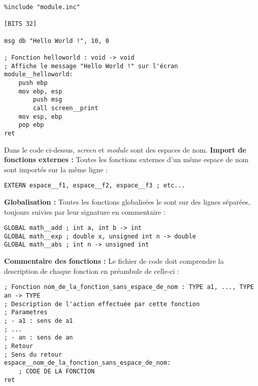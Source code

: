 \documentclass{book}
\begin{document}
\begin{lstlisting}[title=module.asm]
\end{lstlisting}
\begin{verbatim}
%include "module.inc"

[BITS 32]

msg db "Hello World !", 10, 0

; Fonction helloworld : void -> void
; Affiche le message "Hello World !" sur l'écran
module__helloworld:
	push ebp
	mov ebp, esp
		push msg
		call screen__print
	mov esp, ebp
	pop ebp
ret
\end{verbatim}
Dans le code ci-dessus, \textit{screen} et \textit{module} sont des espaces de nom.
\textbf{Import de fonctions externes :} Toutes les fonctions externes d'un même espace de nom sont importés sur la même ligne :
\begin{verbatim}
EXTERN espace__f1, espace__f2, espace__f3 ; etc...
\end{verbatim}
\textbf{Globalisation :} Toutes les fonctions globalisées le sont sur des lignes séparées, toujours suivies par leur signature en commentaire :
\begin{verbatim}
GLOBAL math__add ; int a, int b -> int
GLOBAL math__exp ; double x, unsigned int n -> double
GLOBAL math__abs ; int n -> unsigned int
\end{verbatim}
\textbf{Commentaire des fonctions :} Le fichier de code doit comprendre la description de chaque fonction en préambule de celle-ci :
\begin{verbatim}
; Fonction nom_de_la_fonction_sans_espace_de_nom : TYPE a1, ..., TYPE an -> TYPE
; Description de l'action effectuée par cette fonction
; Parametres
; - a1 : sens de a1
; ...
; - an : sens de an
; Retour
; Sens du retour
espace__nom_de_la_fonction_sans_espace_de_nom:
	; CODE DE LA FONCTION
ret
\end{verbatim}
\end{document}
